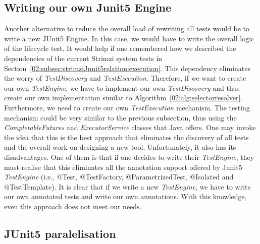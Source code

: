 \subsection{Writing our own Junit5 Engine}

Another alternative to reduce the overall load of rewriting all tests would be to write a new JUnit5 Engine.
In this case, we would have to write the overall logic of the lifecycle test.
It would help if one remembered how we described the dependencies of the current Strimzi system tests in Section~\ref{02:subsec:strimziJunit5relation:execution}.
This dependency eliminates the worry of \emph{TestDiscovery} and \emph{TestExecution}.
Therefore, if we want to create our own \emph{TestEngine}, we have to implement our own \emph{TestDiscovery} and thus create our own implementation similar to Algorithm~\ref{02:alg:selectorresolver}.
Furthermore, we need to create our own \emph{TestExecution} mechanism.
The testing mechanism could be very similar to the previous subsection, thus using the \emph{CompletableFutures} and \emph{ExecutorService} classes that Java offers.
One may invoke the idea that this is the best approach that eliminates the discovery of all tests and the overall work on designing a new tool.
Unfortunately, it also has its disadvantages.
One of them is that if one decides to write their \emph{TestEngine}, they must realise that this eliminates all the annotation support offered by Junit5 \emph{TestEngine} (i.e., @Test, @TestFactory, @ParametrizedTest, @Isolated and @TestTemplate).
It is clear that if we write a new \emph{TestEngine}, we have to write our own annotated tests and write our own annotations.
With this knowledge, even this approach does not meet our needs.


\subsection{JUnit5 paralelisation}

